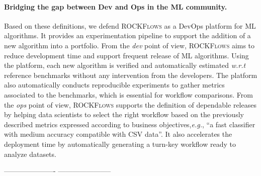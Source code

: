 \documentclass{llncs}
\begin{document}
\paragraph{Bridging the gap between Dev and Ops in the ML community.} Based on these definitions, we defend \textsc{ROCKFlows} as a DevOps platform for ML algorithms. It provides an experimentation pipeline to support the addition of a new algorithm into a portfolio. From the \emph{dev} point of view, \textsc{ROCKFlows} aims to reduce development time and support frequent release of ML algorithms. Using the platform, each new algorithm is verified and automatically estimated \emph{w.r.t} reference benchmarks without any intervention from the developers. The platform also automatically conducts reproducible experiments to gather metrics associated to the benchmarks, which is essential for workflow comparisons. From the \emph{ops} point of view, \textsc{ROCKFlows} supports the definition of dependable releases by helping data scientists to select the right workflow based on the previously described metrics expressed according to business objectives,\emph{e.g.}, ``a fast classifier with medium accuracy compatible with CSV data''. It also accelerates the deployment time by automatically generating a turn-key workflow ready to analyze datasets.


----------------------
-----------------------
\end{document}
